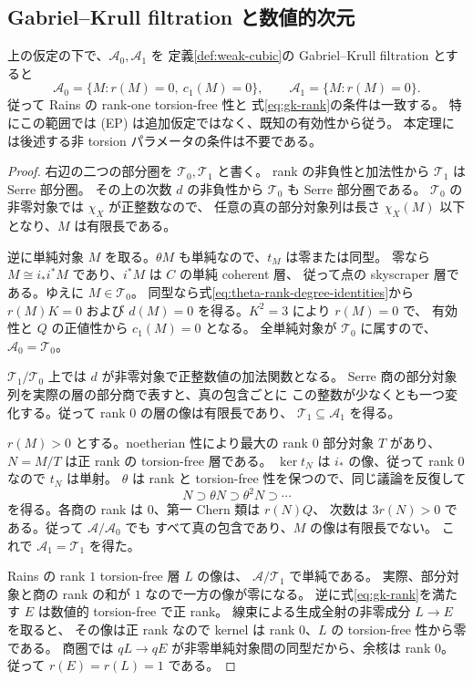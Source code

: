 \subsection{Gabriel--Krull filtration と数値的次元}
\begin{theorem}\label{thm:rains-gk-filtration}
上の仮定の下で、$\mathcal A_0,\mathcal A_1$ を
定義\ref{def:weak-cubic}の Gabriel--Krull filtration とすると
\begin{equation}\label{eq:rains-gk-equalities}
 \mathcal A_0=\{M:r(M)=0,
                  \ c_1(M)=0\},\qquad
 \mathcal A_1=\{M:r(M)=0\}.
\end{equation}
従って Rains の rank-one torsion-free 性と
式\eqref{eq:gk-rank}の条件は一致する。
特にこの範囲では (EP) は追加仮定ではなく、既知の有効性から従う。
本定理には後述する非 torsion パラメータの条件は不要である。
\end{theorem}
\begin{proof}
右辺の二つの部分圏を $\mathcal T_0,\mathcal T_1$ と書く。
rank の非負性と加法性から $\mathcal T_1$ は Serre 部分圏。
その上の次数 $d$ の非負性から $\mathcal T_0$ も Serre 部分圏である。
$\mathcal T_0$ の非零対象では $\chi_X$ が正整数なので、
任意の真の部分対象列は長さ $\chi_X(M)$ 以下となり、$M$ は有限長である。

逆に単純対象 $M$ を取る。$\theta M$ も単純なので、$t_M$ は零または同型。
零なら $M\cong i_*i^*M$ であり、$i^*M$ は $C$ の単純 coherent 層、
従って点の skyscraper 層である。ゆえに $M\in\mathcal T_0$。
同型なら式\eqref{eq:theta-rank-degree-identities}から
$r(M)K=0$ および $d(M)=0$ を得る。$K^2=3$ により $r(M)=0$ で、
有効性と $Q$ の正値性から $c_1(M)=0$ となる。
全単純対象が $\mathcal T_0$ に属すので、$\mathcal A_0=\mathcal T_0$。

$\mathcal T_1/\mathcal T_0$ 上では $d$ が非零対象で正整数値の加法関数となる。
Serre 商の部分対象列を実際の層の部分商で表すと、真の包含ごとに
この整数が少なくとも一つ変化する。従って rank $0$ の層の像は有限長であり、
$\mathcal T_1\subseteq\mathcal A_1$ を得る。

$r(M)>0$ とする。noetherian 性により最大の rank $0$ 部分対象 $T$ があり、
$N=M/T$ は正 rank の torsion-free 層である。
$\ker t_N$ は $i_*$ の像、従って rank $0$ なので $t_N$ は単射。
$\theta$ は rank と torsion-free 性を保つので、同じ議論を反復して
\[
 N\supset\theta N\supset\theta^2N\supset\cdots
\]
を得る。各商の rank は $0$、第一 Chern 類は $r(N)Q$、
次数は $3r(N)>0$ である。従って $\mathcal A/\mathcal A_0$ でも
すべて真の包含であり、$M$ の像は有限長でない。
これで $\mathcal A_1=\mathcal T_1$ を得た。

Rains の rank $1$ torsion-free 層 $L$ の像は、
$\mathcal A/\mathcal T_1$ で単純である。
実際、部分対象と商の rank の和が $1$ なので一方の像が零になる。
逆に式\eqref{eq:gk-rank}を満たす $E$ は数値的 torsion-free で正 rank。
線束による生成全射の非零成分 $L\to E$ を取ると、
その像は正 rank なので kernel は rank $0$、$L$ の torsion-free 性から零である。
商圏では $qL\to qE$ が非零単純対象間の同型だから、余核は rank $0$。
従って $r(E)=r(L)=1$ である。
\end{proof}

